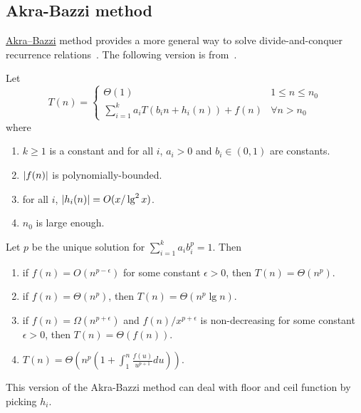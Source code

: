\subsection{Akra\--Bazzi method}
\href{https://en.wikipedia.org/wiki/Binary_search_tree}{Akra--Bazzi} method provides a more general way to solve divide-and-conquer recurrence relations~\cite{Akra1998}. The following version is from~\cite{Leighton1996}.
\begin{theorem}
Let \[T(n) = 
\begin{cases}
\Theta(1)& 1 \leq n \leq n_0 \\
\sum_{i=1}^k a_iT(b_in +h_i(n)) + f(n) &\forall n > n_0
\end{cases}\]
where
\begin{enumerate}
\item $k \geq 1$ is a constant and for all $i$, $a_i > 0$ and $b_i \in (0, 1)$ are constants.
\item $\lvert f(n)\rvert$ is polynomially-bounded.
\item for all $i$, $\lvert h_i(n)\rvert = O(x /\lg^2x)$.
\item $n_0$ is large enough.
\end{enumerate}
Let $p$ be the unique solution for $\sum_{i=1}^k a_ib_i^p = 1$. Then
\begin{enumerate}
\item if $f(n) = O(n^{p-\epsilon})$ for some constant $\epsilon > 0$, then $T(n) = \Theta(n^p)$.
\item if $f(n) = \Theta(n^{p})$, then $T(n) = \Theta(n^p \lg n)$.
\item if $f(n) = \Omega(n^{p+\epsilon})$ and $f(n)/x^{p+\epsilon}$ is non-decreasing for some constant $\epsilon > 0$, then $T(n) = \Theta(f(n))$.
\item $T(n) = \Theta\left(n^p\left(1 + \int_1^n \frac{f(u)}{u^{p+1}}du\right)\right)$.
\end{enumerate}
\end{theorem}

\begin{remark}
This version of the Akra\--Bazzi method can deal with floor and ceil function by picking $h_i$.
\end{remark}

